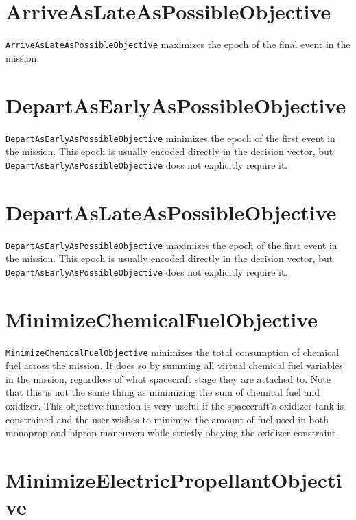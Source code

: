 \section{ArriveAsLateAsPossibleObjective}
\label{sec:ArriveAsLateAsPossibleObjective}

\texttt{ArriveAsLateAsPossibleObjective} maximizes the epoch of the final event in the mission.

\section{DepartAsEarlyAsPossibleObjective}
\label{sec:DepartAsEarlyAsPossibleObjective}

\texttt{DepartAsEarlyAsPossibleObjective} minimizes the epoch of the first event in the mission. This epoch is usually encoded directly in the decision vector, but \texttt{DepartAsEarlyAsPossibleObjective} does not explicitly require it.

\section{DepartAsLateAsPossibleObjective}
\label{sec:DepartAsLateAsPossibleObjective}

\texttt{DepartAsEarlyAsPossibleObjective} maximizes the epoch of the first event in the mission. This epoch is usually encoded directly in the decision vector, but \texttt{DepartAsEarlyAsPossibleObjective} does not explicitly require it.

\section{MinimizeChemicalFuelObjective}
\label{sec:MinimizeChemicalFuelObjective}

\texttt{MinimizeChemicalFuelObjective} minimizes the total consumption of chemical fuel across the mission. It does so by summing all virtual chemical fuel variables in the mission, regardless of what spacecraft stage they are attached to. Note that this is not the same thing as minimizing the sum of chemical fuel and oxidizer. This objective function is very useful if the spacecraft's oxidizer tank is constrained and the user wishes to minimize the amount of fuel used in both monoprop and biprop maneuvers while strictly obeying the oxidizer constraint.

\section{MinimizeElectricPropellantObjective}
\label{sec:MinimizeElectricPropellantObjective}

